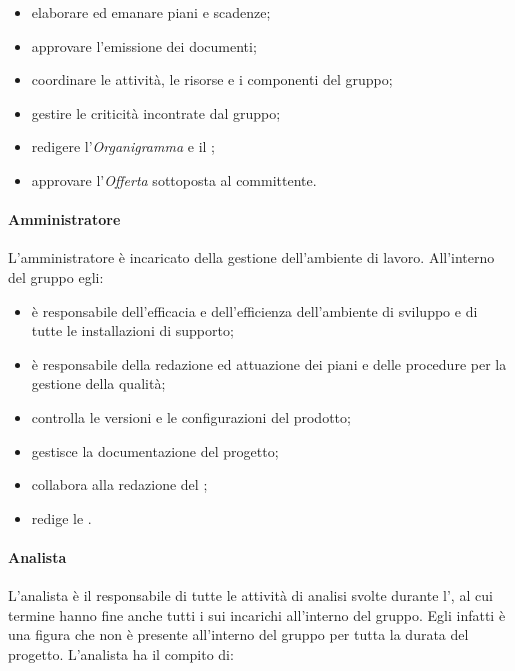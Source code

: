 			\begin{itemize}
				\item elaborare ed emanare piani e scadenze;
				\item approvare l'emissione dei documenti;
				\item coordinare le attività, le risorse e i componenti del gruppo;
				\item gestire le criticità incontrate dal gruppo;
				\item redigere l'\textit{Organigramma} e il ;
				\item approvare l'\textit{Offerta} sottoposta al committente.
			\end{itemize}
		
		\paragraph{Amministratore}
		
			L'amministratore è incaricato della gestione dell'ambiente di lavoro.
			\newline
			All'interno del gruppo egli:
			
			\begin{itemize}
				\item è responsabile dell'efficacia e dell'efficienza dell'ambiente di sviluppo e di tutte le installazioni di supporto;
				\item è responsabile della redazione ed attuazione dei piani e delle procedure per la gestione della qualità;
				\item controlla le versioni e le configurazioni del prodotto;
				\item gestisce la documentazione del progetto;
				\item collabora alla redazione del ;
				\item redige le .
			\end{itemize}
		
		\paragraph{Analista}
		
			L'analista è il responsabile di tutte le attività di analisi svolte durante l', al cui termine hanno fine anche tutti i sui incarichi all'interno del gruppo. Egli infatti è una figura che non è presente all'interno del gruppo per tutta la durata del progetto.
			\newline
			L'analista ha il compito di:
			
